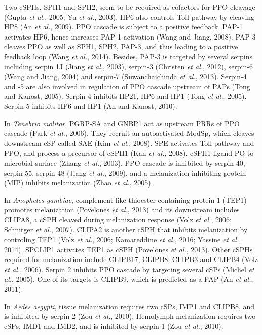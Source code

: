 \documentclass[11pt]{article}
\begin{document}
\begin{sloppypar}
Two cSPHs, SPH1 and SPH2, seem to be required as cofactors for PPO cleavage (Gupta \textit{et al.}, 2005; Yu \textit{et al.}, 2003). 
HP6 also controls Toll pathway by cleaving HP8 (An \textit{et al.}, 2009). 
PPO cascade is subject to a positive feedback. 
PAP-1 activates HP6, hence increases PAP-1 activation (Wang and Jiang, 2008). 
PAP-3 cleaves PPO as well as SPH1, SPH2, PAP-3, and thus leading to a positive feedback loop (Wang \textit{et al.}, 2014). 
Besides, PAP-3 is targeted by several serpins including serpin 1J (Jiang \textit{et al.}, 2003), serpin-3 (Christen \textit{et al.}, 2012), serpin-6 (Wang and Jiang, 2004) and serpin-7 (Suwanchaichinda \textit{et al.}, 2013). 
Serpin-4 and -5 are also involved in regulation of PPO cascade upstream of PAPs (Tong and Kanost, 2005). 
Serpin-4 inhibits HP21, HP6 and HP1 (Tong \textit{et al.}, 2005). 
Serpin-5 inhibits HP6 and HP1 (An and Kanost, 2010). 
\par
In \textit{Tenebrio molitor}, PGRP-SA and GNBP1 act as upstream PRRs of PPO cascade (Park \textit{et al.}, 2006). 
They recruit an autoactivated ModSp, which cleaves downstream cSP called SAE (Kim \textit{et al.}, 2008). 
SPE activates Toll pathway and PPO, and process a precursor of cSPH1 (Kan \textit{et al.}, 2008). 
cSPH1 ligand PO to microbial surface (Zhang \textit{et al.}, 2003). 
PPO cascade is inhibited by serpin 40, serpin 55, serpin 48 (Jiang \textit{et al.}, 2009), and a melanization-inhibiting protein (MIP) inhibits melanization (Zhao \textit{et al.}, 2005).
\par
In \textit{Anopheles gambiae}, complement-like thioester-containing protein 1 (TEP1) promotes melanization (Povelones \textit{et al.}, 2013) and its downstream includes CLIPA8, a cSPH cleaved during melanization response (Volz \textit{et al.}, 2006; Schnitger \textit{et al.}, 2007). 
CLIPA2 is another cSPH that inhibits melanization by controling TEP1 (Volz \textit{et al.}, 2006; Kamareddine \textit{et al.}, 2016; Yassine \textit{et al.}, 2014). 
SPCLIP1 activates TEP1 as cSPH (Povelones \textit{et al.}, 2013). 
Other cSPHs required for melanization include CLIPB17, CLIPB8, CLIPB3 and CLIPB4 (Volz \textit{et al.}, 2006). 
Serpin 2 inhibits PPO cascade by targeting several cSPs (Michel \textit{et al.}, 2005). 
One of its targets is CLIPB9, which is predicted as a PAP (An \textit{et al.}, 2011).
\par 
In \textit{Aedes aegypti}, tissue melanization requires two cSPs, IMP1 and CLIPB8, and is inhibited by serpin-2 (Zou \textit{et al.}, 2010). 
Hemolymph melanization requires two cSPs, IMD1 and IMD2, and is inhibited by serpin-1 (Zou \textit{et al.}, 2010). 

\end{sloppypar}
\end{document}
